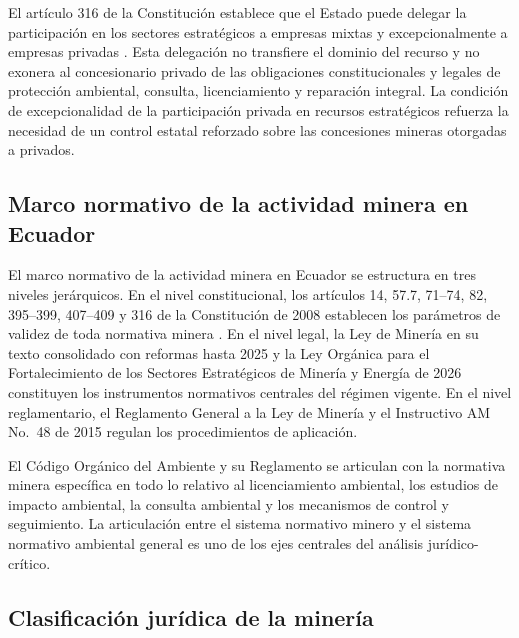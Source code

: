 El artículo 316 de la Constitución establece que el Estado puede delegar la participación en los sectores estratégicos a empresas mixtas y excepcionalmente a empresas privadas \parencite{cre_2008}. Esta delegación no transfiere el dominio del recurso y no exonera al concesionario privado de las obligaciones constitucionales y legales de protección ambiental, consulta, licenciamiento y reparación integral. La condición de excepcionalidad de la participación privada en recursos estratégicos refuerza la necesidad de un control estatal reforzado sobre las concesiones mineras otorgadas a privados.

\subsection{Marco normativo de la actividad minera en Ecuador}

El marco normativo de la actividad minera en Ecuador se estructura en tres niveles jerárquicos. En el nivel constitucional, los artículos 14, 57.7, 71--74, 82, 395--399, 407--409 y 316 de la Constitución de 2008 establecen los parámetros de validez de toda normativa minera \parencite{cre_2008}. En el nivel legal, la Ley de Minería en su texto consolidado con reformas hasta 2025 \parencite{ley_mineria_2025} y la Ley Orgánica para el Fortalecimiento de los Sectores Estratégicos de Minería y Energía de 2026 \parencite{ley_fortalecimiento_2026} constituyen los instrumentos normativos centrales del régimen vigente. En el nivel reglamentario, el Reglamento General a la Ley de Minería \parencite{reglamento_general_ley_mineria_2009} y el Instructivo AM No.\ 48 de 2015 \parencite{instructivo_am48_2015} regulan los procedimientos de aplicación.

El Código Orgánico del Ambiente \parencite{coa_2017} y su Reglamento \parencite{reglamento_coa_2019} se articulan con la normativa minera específica en todo lo relativo al licenciamiento ambiental, los estudios de impacto ambiental, la consulta ambiental y los mecanismos de control y seguimiento. La articulación entre el sistema normativo minero y el sistema normativo ambiental general es uno de los ejes centrales del análisis jurídico-crítico.

\subsection{Clasificación jurídica de la minería}

